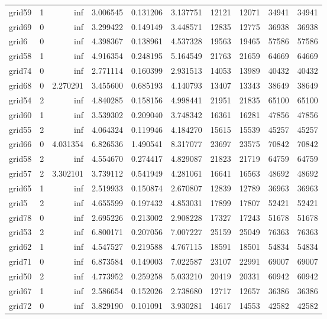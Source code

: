 \begin{longtable}{|l|r|r|r|r|r|r|r|r|r|}
grid59 & 1 & inf & 3.006545 & 0.131206 & 3.137751 & 12121 & 12071 & 34941 & 34941 \\
grid69 & 0 & inf & 3.299422 & 0.149149 & 3.448571 & 12835 & 12775 & 36938 & 36938 \\
grid6 & 0 & inf & 4.398367 & 0.138961 & 4.537328 & 19563 & 19465 & 57586 & 57586 \\
grid58 & 1 & inf & 4.916354 & 0.248195 & 5.164549 & 21763 & 21659 & 64669 & 64669 \\
grid74 & 0 & inf & 2.771114 & 0.160399 & 2.931513 & 14053 & 13989 & 40432 & 40432 \\
grid68 & 0 & 2.270291 & 3.455600 & 0.685193 & 4.140793 & 13407 & 13343 & 38649 & 38649 \\
grid54 & 2 & inf & 4.840285 & 0.158156 & 4.998441 & 21951 & 21835 & 65100 & 65100 \\
grid60 & 1 & inf & 3.539302 & 0.209040 & 3.748342 & 16361 & 16281 & 47856 & 47856 \\
grid55 & 2 & inf & 4.064324 & 0.119946 & 4.184270 & 15615 & 15539 & 45257 & 45257 \\
grid66 & 0 & 4.031354 & 6.826536 & 1.490541 & 8.317077 & 23697 & 23575 & 70842 & 70842 \\
grid58 & 2 & inf & 4.554670 & 0.274417 & 4.829087 & 21823 & 21719 & 64759 & 64759 \\
grid57 & 2 & 3.302101 & 3.739112 & 0.541949 & 4.281061 & 16641 & 16563 & 48692 & 48692 \\
grid65 & 1 & inf & 2.519933 & 0.150874 & 2.670807 & 12839 & 12789 & 36963 & 36963 \\
grid5 & 2 & inf & 4.655599 & 0.197432 & 4.853031 & 17899 & 17807 & 52421 & 52421 \\
grid78 & 0 & inf & 2.695226 & 0.213002 & 2.908228 & 17327 & 17243 & 51678 & 51678 \\
grid53 & 2 & inf & 6.800171 & 0.207056 & 7.007227 & 25159 & 25049 & 76363 & 76363 \\
grid62 & 1 & inf & 4.547527 & 0.219588 & 4.767115 & 18591 & 18501 & 54834 & 54834 \\
grid71 & 0 & inf & 6.873584 & 0.149003 & 7.022587 & 23107 & 22991 & 69007 & 69007 \\
grid50 & 2 & inf & 4.773952 & 0.259258 & 5.033210 & 20419 & 20331 & 60942 & 60942 \\
grid67 & 1 & inf & 2.586654 & 0.152026 & 2.738680 & 12717 & 12657 & 36386 & 36386 \\
grid72 & 0 & inf & 3.829190 & 0.101091 & 3.930281 & 14617 & 14553 & 42582 & 42582 \\

\end{longtable}
